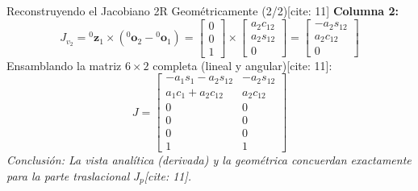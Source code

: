 \documentclass[aspectratio=169, xcolor={table,xcdraw}]{beamer}
\begin{document}
\begin{frame}{Reconstruyendo el Jacobiano 2R Geométricamente (2/2)[cite: 11]}
    \textbf{Columna 2:}
    \begin{equation*}
        J_{v_2} = {}^0\mathbf{z}_1 \times ({}^0\mathbf{o}_2 - {}^0\mathbf{o}_1) = \begin{bmatrix} 0 \\ 0 \\ 1 \end{bmatrix} \times \begin{bmatrix} a_2c_{12} \\ a_2s_{12} \\ 0 \end{bmatrix} = \begin{bmatrix} -a_2s_{12} \\ a_2c_{12} \\ 0 \end{bmatrix}
    \end{equation*}
    Ensamblando la matriz $6 \times 2$ completa (lineal y angular)[cite: 11]:
    \begin{equation*}
        \boxed{
        J = \begin{bmatrix}
        -a_1s_1-a_2s_{12} & -a_2s_{12} \\
        a_1c_1+a_2c_{12} & a_2c_{12} \\
        0 & 0 \\
        0 & 0 \\
        0 & 0 \\
        1 & 1
        \end{bmatrix}
        }
    \end{equation*}
    \textit{Conclusión: La vista analítica (derivada) y la geométrica concuerdan exactamente para la parte traslacional $J_p$[cite: 11].}
\end{frame}
\end{document}
